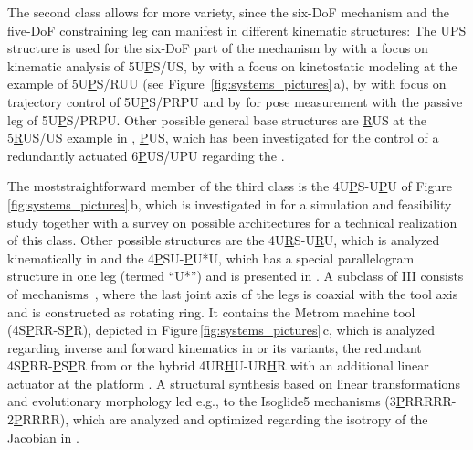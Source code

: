 \documentclass[robotics,article,accept,moreauthors,pdftex]{Definitions/mdpi}
\begin{document}
The second class allows for more variety, since the six-DoF mechanism and the five-DoF constraining leg can manifest in different kinematic structures:
The U\underline{{P}}S structure is used for the six-DoF part of the mechanism 
  by \cite{WangGos1997} with a focus on kinematic analysis of 5U\underline{P}S/US, 
  by \cite{ZhangGos2001} with a focus on kinetostatic modeling at the example of 5U\underline{P}S/RUU (see Figure\ \ref{fig:systems_pictures}\,a), 
  by \cite{ZhengGaoZha2005} with focus on trajectory control of 5U\underline{P}S/PRPU and 
  by \cite{GaoSunZha2004} for pose measurement with the passive leg of 5U\underline{P}S/PRPU.
Other possible general base structures are \underline{R}US at the 5\underline{R}US/US example in \cite{WangGos1997}, \underline{P}US, which has been investigated for the control of a redundantly actuated 6\underline{P}US/UPU regarding the  .

The most\replaced[id=Sp]{-}{ }straightforward member of the third class is the 4U\underline{P}S-U\underline{P}U of Figure\,\ref{fig:systems_pictures}\,b, which is investigated in \cite{MbarekNefCor2005} for a simulation and feasibility study together with a survey on possible architectures for a technical realization of this class.
Other possible structures are 
  the 4U\underline{R}S-U\underline{R}U, which is analyzed kinematically in \cite{SchreiberGos2003} and
  the 4\underline{P}SU-\underline{P}U*U, which has a special parallelogram structure in one leg (termed ``U*'') and is presented in \cite{GaoPenZhaLi2006}.
A sub\replaced[id=Sp]{}{-}class of III consists of mechanisms~\cite{BaerWei2006,LinLiYanZha2013,AlaghebandMahMilBen2015}, where the last joint axis of the legs is coaxial with the tool axis and is constructed as rotating ring.
It contains the
  Metrom machine tool (4S\underline{P}RR-S\underline{P}R), depicted in Figure\,\ref{fig:systems_pictures}\,c, which is analyzed regarding inverse and forward kinematics in \cite{BaerWei2006} or its variants, 
  the redundant 4S\underline{P}RR-\underline{P}S\underline{P}R from \cite{AlaghebandMahMilBen2015} or 
  the hybrid 4UR\underline{H}U-UR\underline{H}R with an additional linear actuator at the platform \cite{LinLiYanZha2013}.
A structural synthesis based on linear transformations and evolutionary morphology \cite{Gogu2008} led e.g., to the Isoglide5 mechanisms (3\underline{P}RRRRR-2\underline{P}RRRR), which are analyzed and optimized regarding the isotropy of the Jacobian in \cite{Gogu2006}.
\end{document}
